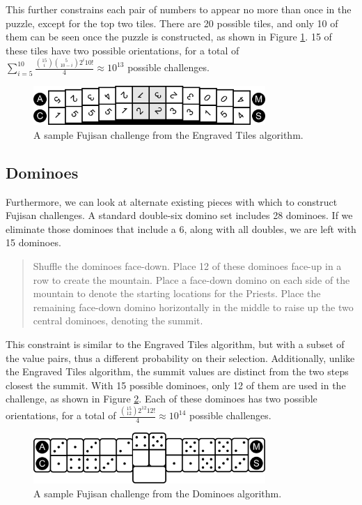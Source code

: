 \documentclass[journal]{IEEEtran}
\begin{document}
This further constrains each pair of numbers to appear no more than once in the puzzle, except for the top two tiles. There are 20 possible tiles, and only 10 of them can be seen once the puzzle is constructed, as shown in Figure \ref{fig:tileexample}. 15 of these tiles have two possible orientations, for a total of $\sum_{i = 5}^{10}\frac{{15 \choose i}\binom{5}{10 - i}2^{i}10!}{4} \approx 10^{13}
$ possible challenges.

\begin{figure}[b]
\includegraphics[width=8.8cm]{fujisan-engraved.png}
\caption{A sample Fujisan challenge from the Engraved Tiles algorithm.}
\label{fig:tileexample}
\end{figure}


\subsection{Dominoes}
Furthermore, we can look at alternate existing pieces with which to construct Fujisan challenges. A standard double-six domino set includes 28 dominoes. If we eliminate those dominoes that include a 6, along with all doubles, we are left with 15 dominoes. 

\begin{quote}
    
  Shuffle the dominoes face-down. Place 12 of these dominoes face-up in a row to create the mountain. Place a face-down domino on each side of the mountain to denote the starting locations for the Priests. Place the remaining face-down domino horizontally in the middle to raise up the two central dominoes, denoting the summit.
\end{quote}

This constraint is similar to the Engraved Tiles algorithm, but with a subset of the value pairs, thus a different probability on their selection.  Additionally, unlike the Engraved Tiles algorithm, the summit values are distinct from the two steps closest the summit.
With 15 possible dominoes, only 12 of them are used in the challenge, as shown in Figure \ref{fig:dominoexample}. Each of these dominoes has two possible orientations, for a total of $\frac{{15 \choose 12}2^{12}12!}{4} \approx 10^{14}$ possible challenges. 

\begin{figure}[b]
\includegraphics[width=8.8cm]{dominoexample.png}
\caption{A sample Fujisan challenge from the Dominoes algorithm.}
\label{fig:dominoexample}
\end{figure}
\end{document}
